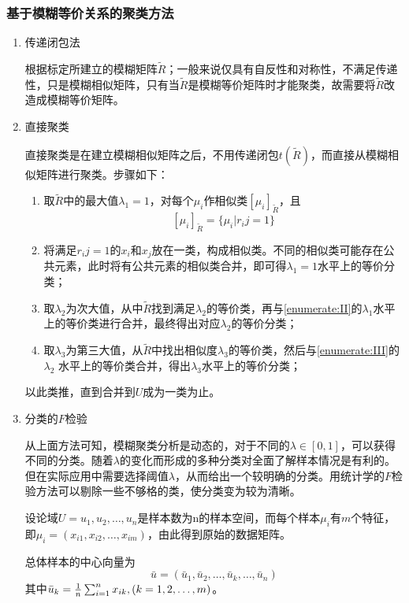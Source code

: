 \subsubsection{基于模糊等价关系的聚类方法}
\begin{enumerate}[label=（\arabic*）]
	\item  传递闭包法
	
	根据标定所建立的模糊矩阵$\tilde{R}$；一般来说仅具有自反性和对称性，不满足传递性，只是模糊相似矩阵，只有当$\tilde{R}$是模糊等价矩阵时才能聚类，故需要将$\tilde{R}$改造成模糊等价矩阵。
	\item  直接聚类
	
	直接聚类是在建立模糊相似矩阵之后，不用传递闭包$t(\tilde{R})$，而直接从模糊相似矩阵进行聚类。步骤如下：
	\begin{enumerate}[label=（\alph*）]
		\item 取$\tilde{R}$中的最大值$\lambda_1=1$，对每个$\mu_i$作相似类${[\mu_i]}_{\tilde{R}}$，且$$ {[\mu_i]}_{\tilde{R}} = \{\mu_i | r_ij = 1 \} $$
		
		\item{\label{enumerate:II}} 将满足$r_ij=1$的$x_i$和$x_j$放在一类，构成相似类。不同的相似类可能存在公共元素，此时将有公共元素的相似类合并，即可得$\lambda_1=1$水平上的等价分类；
		\item{\label{enumerate:III}} 取$\lambda_2$为次大值，从中$\tilde{R}$找到满足$\lambda_2$的等价类，再与\ref{enumerate:II}的$\lambda_1$水平上的等价类进行合并，最终得出对应$\lambda_2$的等价分类； 
		\item 取$\lambda_3$为第三大值，从$\tilde{R}$中找出相似度$\lambda_3$的等价类，然后与\ref{enumerate:III}的 $\lambda_2$ 水平上的等价类合并，得出$\lambda_3$水平上的等价分类；
	\end{enumerate}
	以此类推，直到合并到$U$成为一类为止。
	
	\item  分类的$F$检验
	
	从上面方法可知，模糊聚类分析是动态的，对于不同的$\lambda \in[0,1]$，可以获得不同的分类。随着$\lambda$的变化而形成的多种分类对全面了解样本情况是有利的。但在实际应用中需要选择阈值$\lambda$，从而给出一个较明确的分类。用统计学的$F$检验方法可以剔除一些不够格的类，使分类变为较为清晰。
	
	设论域$U={u_1,u_2,\dots,u_n}$是样本数为n的样本空间，而每个样本$μ_i$有$m$个特征，即$μ_i=(x_{i1},x_{i2},\dots,x_{im})$，由此得到原始的数据矩阵。
	
	总体样本的中心向量为
	\begin{equation}
		\bar{u} = (\bar{u}_1,\bar{u}_2,\dots,\bar{u}_k,\dots,\bar{u}_n)
	\end{equation}
	其中$\bar{u}_k = {1\over n}\sum_{i=1}^{n}x_{ik} , (k=1,2,\dots,m)$。
	

\end{enumerate}
